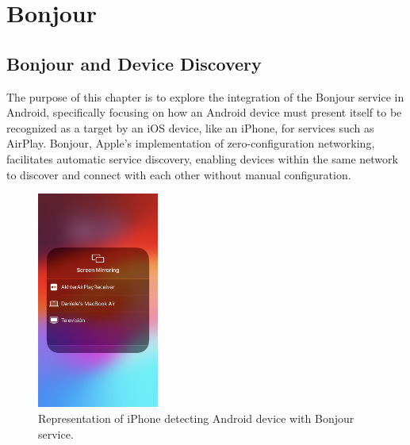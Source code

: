   {\color{teal!90}\chapter{Bonjour}\label{cap:Bonjour}}


  \minitoc %

  \section{Bonjour and Device Discovery}
  \label{sec:Bonjour}

  The purpose of this chapter is to explore the integration of the Bonjour service in Android, specifically focusing on how an Android device must present itself to be recognized as a target by an iOS device, like an iPhone, for services such as AirPlay. Bonjour, Apple's implementation of zero-configuration networking, facilitates automatic service discovery, enabling devices within the same network to discover and connect with each other without manual configuration.

  \begin{figure}
    \centering
    \includegraphics[width=4cm]{./chapters/iPhoneDetecting.jpeg}
    \caption{Representation of iPhone detecting Android device with Bonjour service.}\label{fig:iPhone-detecting}
  \end{figure}

